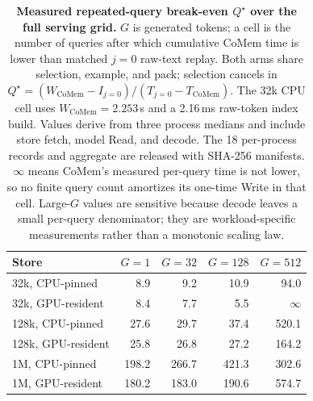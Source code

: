 \begin{table}[!htbp]
\centering
\small
\setlength{\tabcolsep}{5pt}
\begin{tabular}{@{}lrrrr@{}}
\toprule
\textbf{Store} & \textbf{$G{=}1$} & \textbf{$G{=}32$} &
\textbf{$G{=}128$} & \textbf{$G{=}512$} \\
\midrule
32k, CPU-pinned & 8.9 & 9.2 & 10.9 & 94.0 \\
32k, GPU-resident & 8.4 & 7.7 & 5.5 & $\infty$ \\
128k, CPU-pinned & 27.6 & 29.7 & 37.4 & 520.1 \\
128k, GPU-resident & 25.8 & 26.8 & 27.2 & 164.2 \\
1M, CPU-pinned & 198.2 & 266.7 & 421.3 & 302.6 \\
1M, GPU-resident & 180.2 & 183.0 & 190.6 & 574.7 \\
\bottomrule
\end{tabular}
\caption{\textbf{Measured repeated-query break-even $Q^\star$ over the full
serving grid.}
$G$ is generated tokens; a cell is the number of queries after which cumulative
CoMem time is lower than matched $j{=}0$ raw-text replay. Both arms share
selection, example, and pack; selection cancels in
$Q^\star=(W_{\mathrm{CoMem}}-I_{j=0})/
(T_{j=0}-T_{\mathrm{CoMem}})$. The 32k CPU cell uses
$W_{\mathrm{CoMem}}{=}2.253$\,s and a 2.16\,ms raw-token index build.
Values derive from three process medians and include store fetch, model Read,
and decode. The 18 per-process records and aggregate are released with
SHA-256 manifests. $\infty$ means CoMem's measured per-query time is not
lower, so no finite query count amortizes its one-time Write in that cell.
Large-$G$ values are sensitive because decode leaves a small per-query
denominator; they are workload-specific measurements rather than a monotonic
scaling law.}
\label{tab:serving-crossover}
\end{table}

